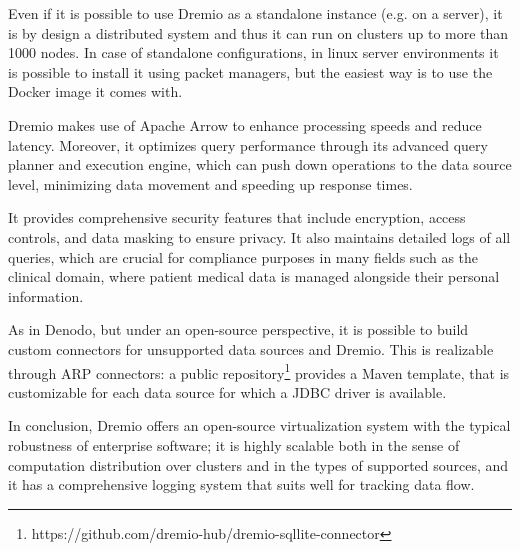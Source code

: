Even if it is possible to use Dremio as a standalone instance (e.g. on a server), it is by design a distributed system and thus it can run on clusters up to more than 1000 nodes. In case of standalone configurations, in linux server environments it is possible to install it using packet managers, but the easiest way is to use the Docker image it comes with.

Dremio makes use of Apache Arrow to enhance processing speeds and reduce latency. Moreover, it optimizes query performance through its advanced query planner and execution engine, which can push down operations to the data source level, minimizing data movement and speeding up response times.

It provides comprehensive security features that include encryption, access controls, and data masking to ensure privacy. It also maintains detailed logs of all queries, which are crucial for compliance purposes in many fields such as the clinical domain, where patient medical data is managed alongside their personal information.

As in Denodo, but under an open-source perspective, it is possible to build custom connectors for unsupported data sources and Dremio. This is realizable through \ac{ARP} connectors: a public repository\footnote{https://github.com/dremio-hub/dremio-sqllite-connector} provides a Maven template, that is customizable for each data source for which a \ac{JDBC} driver is available.

In conclusion, Dremio offers an open-source virtualization system with the typical robustness of enterprise software; it is highly scalable both in the sense of computation distribution over clusters and in the types of supported sources, and it has a comprehensive logging system that suits well for tracking data flow.

